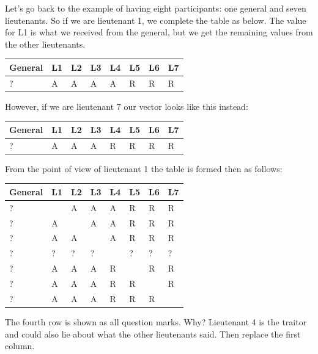 \documentclass[a4paper]{report}
\begin{document}
Let's go back to the example of having eight participants: one general and seven lieutenants. So if we are lieutenant 1, we complete the table as below. The value for L1 is what we received from the general, but we get the remaining values from the other lieutenants.

\begin{center}
	\begin{tabular}{|l|l|l|l|l|l|l|l|}
		\hline
		General & L1 & L2 & L3 & L4 & L5 & L6 & L7 \\
		\hline
		?       & A  & A  & A  & A  & R  & R  & R  \\
		\hline
	\end{tabular}
\end{center}

However, if we are lieutenant 7 our vector looks like this instead:

\begin{center}
	\begin{tabular}{|l|l|l|l|l|l|l|l|}
		\hline
		General & L1 & L2 & L3 & L4 & L5 & L6 & L7 \\
		\hline
		?       & A  & A  & A  & R  & R  & R  & R  \\
		\hline
	\end{tabular}
\end{center}

From the point of view of lieutenant 1 the table is formed then as follows:

\begin{center}
	\begin{tabular}{|l|l|l|l|l|l|l|l|}
		\hline
		General & L1 & L2 & L3 & L4 & L5 & L6 & L7 \\
		\hline
		?       & ~  & A  & A  & A  & R  & R  & R  \\ \hline
		?       & A  & ~  & A  & A  & R  & R  & R  \\ \hline
		?       & A  & A  & ~  & A  & R  & R  & R  \\ \hline
		?       & ?  & ?  & ?  & ~  & ?  & ?  & ?  \\ \hline
		?       & A  & A  & A  & R  & ~  & R  & R  \\ \hline
		?       & A  & A  & A  & R  & R  & ~  & R  \\ \hline
		?       & A  & A  & A  & R  & R  & R  & ~  \\ \hline
	\end{tabular}
\end{center}

The fourth row is shown as all question marks. Why? Lieutenant 4 is the traitor and could also lie about what the other lieutenants said. Then replace the first column.
\end{document}
